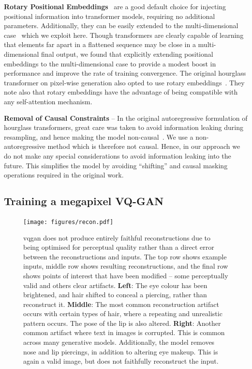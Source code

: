 \textbf{Rotary Positional Embeddings}~\cite{su2021roformer} are a good default
choice for injecting positional information into transformer models, requiring
no additional parameters. Additionally, they can be easily extended to the
multi-dimensional case~\cite{rope-eleutherai} which we exploit here. Though
transformers are clearly capable of learning that elements far apart in a
flattened sequence may be close in a multi-dimensional final output, we found
that explicitly extending positional embeddings to the multi-dimensional case to
provide a modest boost in performance and improve the rate of training
convergence. The original hourglass transformer on pixel-wise generation also
opted to use rotary embeddings~\cite{nawrot2021hierarchical}. They note also
that rotary embeddings have the advantage of being compatible with any
self-attention mechanism.

\textbf{Removal of Causal Constraints} -- In the original autoregressive
formulation of hourglass transformers, great care was taken to avoid information
leaking during resampling, and hence making the model
non-causal~\cite{nawrot2021hierarchical}. We use a non-autoregressive method
which is therefore not causal. Hence, in our approach we do not make any special
considerations to avoid information leaking into the future. This simplifies the
model by avoiding ``shifting'' and causal masking operations required in the original work.

\subsection{Training a megapixel VQ-GAN}
\label{subsec:megagan}

\begin{figure}[ht]
    \centering
    \texttt{[image: figures/recon.pdf]}
    \caption{
        \gls{vqgan} does not produce entirely faithful reconstructions due to
        being optimised for perceptual quality rather than a direct error between
        the reconstructions and inputs. The top row shows example inputs, middle row
        shows resulting reconstructions, and the final row shows points of interest that
        have been modified -- some perceptually valid and others clear
        artifacts. 
        \textbf{Left}: The eye colour has been brightened, and hair
        shifted to conceal a piercing, rather than reconstruct it.
        \textbf{Middle}: The most common reconstruction artifact occurs with
        certain types of hair, where a repeating and unrealistic pattern occurs. The
        pose of the lip is also altered. 
        \textbf{Right}: Another common artifact where text in images is
        corrupted. This is common across many generative models. Additionally,
        the model removes nose and lip piercings, in addition to altering eye
        makeup. This is again a valid image, but does not faithfully reconstruct
        the input.}
    \label{fig:recon}
\end{figure}

